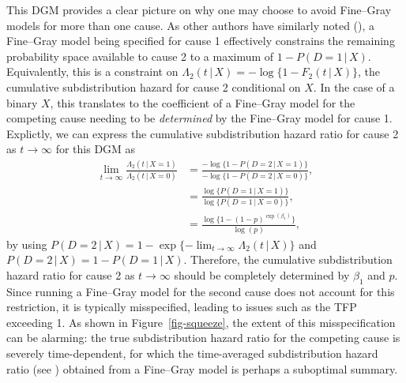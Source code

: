 \documentclass[
  letterpaper,
  paper=240mm:170mm,
  twoside=true,
  open=right,
  fontsize=10pt,
  pagesize=false,
  BCOR=15mm,
  DIV=14,
  headinclude=true,
  footinclude=false,
  headsepline=on]{scrbook}
\newcommand{\given}{\,|\,}
\begin{document}
This DGM provides a clear picture on why one may choose to avoid
Fine--Gray models for more than one cause. As other authors have
similarly noted
(), a Fine--Gray model being specified for cause 1
effectively constrains the remaining probability space available to
cause 2 to a maximum of \(1 - P(D = 1 \given X)\). Equivalently, this is
a constraint on
\(\Lambda_2(t \given X) = -\log\{1 - F_2(t \given X)\}\), the cumulative
subdistribution hazard for cause 2 conditional on \(X\). In the case of
a binary \(X\), this translates to the coefficient of a Fine--Gray model
for the competing cause needing to be \textit{determined} by the
Fine--Gray model for cause 1. Explictly, we can express the cumulative
subdistribution hazard ratio for cause 2 as \(t \to \infty\) for this
DGM as \begin{align*}
    \lim_{t \to \infty} \frac{\Lambda_{2}(t \given X = 1)}{\Lambda_{2}(t \given X = 0)} &= \frac{-\log\{1 - P(D = 2 \given X = 1)\}}{-\log\{1 - P(D = 2 \given X = 0)\}} ,\\
    &= \frac{\log \{P(D = 1 \given X = 1)\}}{\log \{P(D = 1 \given X = 0)\}}, \\
    &= \frac{\log \{1 - (1-p)^{\exp(\beta_1)}\}}{\log(p)},
\end{align*} by using
\(P(D = 2 \given X) = 1 - \exp\{-  \lim_{t \to \infty} \Lambda_2(t \given X)\}\)
and \(P(D = 2 \given X) = 1 - P(D = 1 \given X)\). Therefore, the
cumulative subdistribution hazard ratio for cause 2 as \(t \to \infty\)
should be completely determined by \(\beta_1\) and \(p\). Since running
a Fine--Gray model for the second cause does not account for this
restriction, it is typically misspecified, leading to issues such as the
TFP exceeding 1. As shown in Figure~\ref{fig-squeeze}, the extent of
this misspecification can be alarming: the true subdistribution hazard
ratio for the competing cause is severely time-dependent, for which the
time-averaged subdistribution hazard ratio (see
) obtained from a Fine--Gray model is perhaps a
suboptimal summary.
\end{document}
